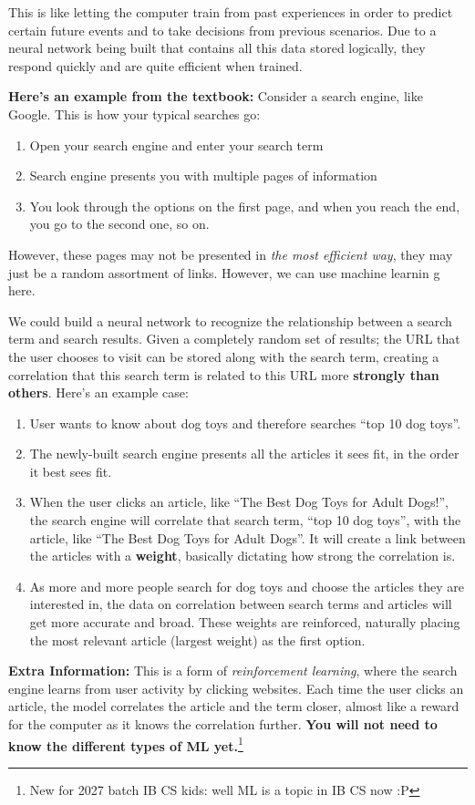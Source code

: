 \documentclass[../main.tex]{subfiles}
\begin{document}
This is like letting the computer train from past experiences in order to predict certain future events and to take decisions from previous scenarios. Due to a neural network being built that contains all this data stored logically, they respond quickly and are quite efficient when trained. 
 
\textbf{Here’s an example from the textbook:} Consider a search engine, like Google. This is how your typical searches go:

\begin{enumerate}
    \item Open your search engine and enter your search term
    \item Search engine presents you with multiple pages of information
    \item You look through the options on the first page, and when you reach the end, you go to the second one, so on.
\end{enumerate}

However, these pages may not be presented in \emph{the most efficient way}, they may just be a random assortment of links. However, we can use machine learnin g here.

We could build a neural network to recognize the relationship between a search term and search results. Given a completely random set of results; the URL that the user chooses to visit can be stored along with the search term, creating a correlation that this search term is related to this URL more \textbf{strongly than others}. Here’s an example case:

\begin{enumerate}
    \item User wants to know about dog toys and therefore searches “top 10 dog toys”.
    \item The newly-built search engine presents all the articles it sees fit, in the order it best sees fit.
    \item When the user clicks an article, like “The Best Dog Toys for Adult Dogs!”, the search engine will correlate that search term, “top 10 dog toys”, with the article, like “The Best Dog Toys for Adult Dogs”. It will create a link between the articles with a \textbf{weight}, basically dictating how strong the correlation is.
    \item As more and more people search for dog toys and choose the articles they are interested in, the data on correlation between search terms and articles will get more accurate and broad. These weights are reinforced, naturally placing the most relevant article (largest weight) as the first option.
\end{enumerate}

\textbf{Extra Information:} This is a form of \emph{reinforcement learning}, where the search engine learns from user activity by clicking websites. Each time the user clicks an article, the model correlates the article and the term closer, almost like a reward for the computer as it knows the correlation further. \textbf{You will not need to know the different types of ML yet.}\footnote{New for 2027 batch IB CS kids: well ML is a topic in IB CS now :P}
\end{document}
